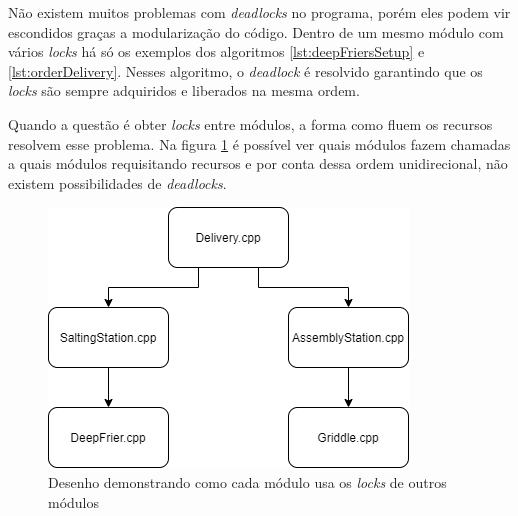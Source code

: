\documentclass[a4paper]{article}
\begin{document}
Não existem muitos problemas com \textit{deadlocks} no programa, porém eles podem vir escondidos graças a modularização do código. Dentro de um mesmo módulo com vários \textit{locks} há só os exemplos dos algoritmos \ref{lst:deepFriersSetup} e \ref{lst:orderDelivery}. Nesses algoritmo, o \textit{deadlock} é resolvido garantindo que os \textit{locks} são sempre adquiridos e liberados na mesma ordem. 

Quando a questão é obter \textit{locks} entre módulos, a forma como fluem os recursos resolvem esse problema. Na figura \ref{fig:locksUse} é possível ver quais módulos fazem chamadas a quais módulos requisitando recursos e por conta dessa ordem unidirecional, não existem possibilidades de \textit{deadlocks}.

\begin{figure}[H]
	\centering
	\includegraphics[width=0.5\linewidth]{locks_use.png}
	\caption{Desenho demonstrando como cada módulo usa os \textit{locks} de outros módulos}
	\label{fig:locksUse}
\end{figure}
\end{document}
